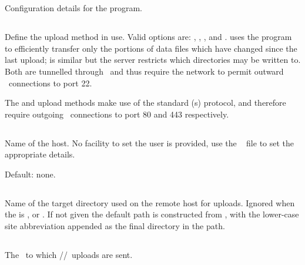 \section{\code{[upload]}}
Configuration details for the  program.

\subsection{}
Define the upload method in use. Valid options are: ,
, , and .  uses the
 program to efficiently transfer only the portions of
data files which have changed since the last upload;  is
similar but the server restricts which directories may be written
to. Both are tunnelled through \ssh\ and thus require the network to
permit outward \tcp\ connections to port 22.

The  and  upload methods make use of the standard
\http(s) protocol, and therefore require outgoing \tcp\ connections to
port 80 and 443 respectively. 

\subsection{}
Name of the  host. No facility to set the user is
provided, use the \ssh\  file to set the
appropriate details.

Default: none.


\subsection{}
Name of the target directory used on the remote host for 
uploads. Ignored when the  is , 
or . If not given the default path is constructed from
, with the lower-case site
abbreviation appended as the final directory in the path.

\subsection{}
The \URL\ to which \http/\slash \https\ uploads are sent.

